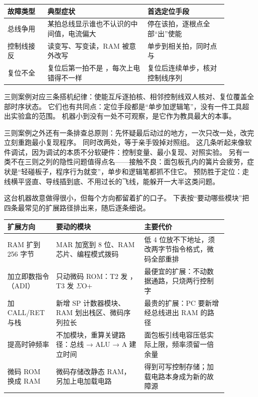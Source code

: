 \begin{longtable}{L{0.16\linewidth}L{0.40\linewidth}L{0.32\linewidth}}
\toprule
故障类型 & 典型症状 & 首选定位手段 \\
\midrule
总线争用 & 某拍总线显示谁也不认识的中间值，电流偏大 & 停在该拍，逐根点全部“出”使能 \\\tablerowrule
控制线接反 & 读变写、写变读，RAM 被意外改写 & 单步到相关拍，同时点  与  \\\tablerowrule
复位不全 & 复位后第一拍不是 ，每次上电错得不一样 & 复位后连续单步，核对控制线序列 \\
\bottomrule
\end{longtable}

三则案例对应三条搭机纪律：使能互斥逐拍核、相邻控制线双人核对、复位覆盖全部时序状态。
它们也有共同点：定位手段都是“单步加逻辑笔”，没有一件工具超出实验盒的范围。
机器小到没有一处不可观察，是它作为教具最大的本事。

三则案例之外还有一条排查总原则：先怀疑最后动过的地方，一次只改一处，改完立刻重跑最小复现程序。
同时改两处，等于亲手毁掉对照组。
这几条听起来像软件调试，因为调试的本质不分软硬件：控制变量、最小复现、对照实验。
另有一类不在三则之列的隐性问题值得点名——接触不良：面包板孔内的簧片会疲劳，症状是“轻碰板子，程序行为就变”，单步和逻辑笔都抓不住它。
预防胜于定位：走线横平竖直、导线插到底、不用过长的飞线，能躲开一大半这类问题。

这台机器故意做得很小，但每个方向都留着扩的口子。
下表按“要动哪些模块”把四条最常见的扩展路径排出来，随后逐条细说。

\begin{longtable}{L{0.18\linewidth}L{0.36\linewidth}L{0.34\linewidth}}
\toprule
扩展方向 & 要动的模块 & 主要代价 \\
\midrule
RAM 扩到 256 字节 & MAR 加宽到 8 位、RAM 芯片、编程模式拨码 & 低 4 位放不下地址，须改两字节指令格式，微码全部重排 \\\tablerowrule
加立即数指令（ADI） & 只动微码 ROM：T2 发 ，T3 发 $\Sigma$O+ & 最便宜的扩展：不动数据通路，只烧两行控制字 \\\tablerowrule
加 CALL/RET 与栈 & 新增 SP 计数器模块、RAM 划出栈区、微码序列拉长 & 最贵的扩展：PC 要新增经总线进出 RAM 的路径 \\\tablerowrule
提高时钟频率 & 不加模块，重算关键路径：总线 → ALU → A 建立时间 & 面包板引线电容压低实际上限，频率须留一倍余量 \\\tablerowrule
微码 ROM 换成 RAM & 微码存储改静态 RAM，另加上电加载电路 & 得到可写控制存储；加载电路本身成为新的故障源 \\
\bottomrule
\end{longtable}


